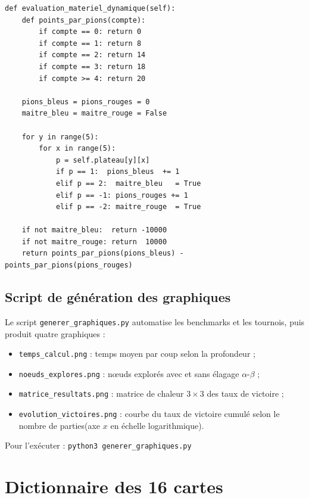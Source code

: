 \documentclass[12pt, a4paper]{article}
\begin{document}
\begin{lstlisting}[caption={Heuristique H2 : valeur marginale décroissante des pions.}]
def evaluation_materiel_dynamique(self):
    def points_par_pions(compte):
        if compte == 0: return 0
        if compte == 1: return 8
        if compte == 2: return 14
        if compte == 3: return 18
        if compte >= 4: return 20

    pions_bleus = pions_rouges = 0
    maitre_bleu = maitre_rouge = False

    for y in range(5):
        for x in range(5):
            p = self.plateau[y][x]
            if p == 1:  pions_bleus  += 1
            elif p == 2:  maitre_bleu   = True
            elif p == -1: pions_rouges += 1
            elif p == -2: maitre_rouge  = True

    if not maitre_bleu:  return -10000
    if not maitre_rouge: return  10000
    return points_par_pions(pions_bleus) - points_par_pions(pions_rouges)
\end{lstlisting}

\subsection{Script de génération des graphiques}

Le script \texttt{generer\_graphiques.py} automatise les benchmarks et les tournois, 
puis produit quatre graphiques :
\begin{itemize}
  \item \texttt{temps\_calcul.png} : temps moyen par coup selon la profondeur ;
  \item \texttt{noeuds\_explores.png} : nœuds explorés avec et sans élagage $\alpha\text{-}\beta$ ;
  \item \texttt{matrice\_resultats.png} : matrice de chaleur $3\times3$ des taux de victoire ;
  \item \texttt{evolution\_victoires.png} : courbe du taux de victoire cumulé selon le nombre de parties(axe $x$ en échelle logarithmique).
\end{itemize}

\noindent Pour l'exécuter : \texttt{python3 generer\_graphiques.py}

\section{Dictionnaire des 16 cartes}
\label{ann:cartes}
\end{document}
